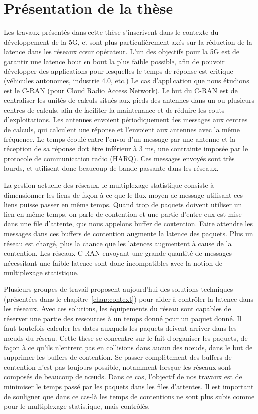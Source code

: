 
\chapter*{Présentation de la thèse}
\label{chap:introfr}
\minitoc

Les travaux présentés dans cette thèse s'inscrivent dans le contexte du développement de la 5G, et sont plus particulièrement axés sur la réduction de la latence dans les réseaux cœur opérateur.
L'un des objectifs pour la 5G est de garantir une latence bout en bout la plus faible possible, afin de pouvoir développer des applications pour lesquelles le temps de réponse est critique (véhicules autonomes, industrie 4.0, etc.)
Le cas d'application que nous étudions est le C-RAN (pour Cloud Radio Access Network). Le but du C-RAN est de centraliser les unités de calculs situés aux pieds des antennes dans un ou plusieurs centres de calculs, afin de faciliter la maintenance et de réduire les couts d'exploitations. Les antennes envoient périodiquement des messages aux centres de calculs, qui calculent une réponse et l'envoient aux antennes avec la même fréquence. Le temps écoulé entre l'envoi d'un message par une antenne et la réception de sa réponse doit être inférieur à $3$ ms, une contrainte imposée par le protocole de communication radio (HARQ). Ces messages envoyés sont très lourds, et utilisent donc beaucoup de bande passante dans les réseaux.

La gestion actuelle des réseaux, le multiplexage statistique consiste à dimensionner les liens de façon à ce que le flux moyen de message utilisant ces liens puisse passer en même temps. Quand trop de paquets doivent utiliser un lien en même temps, on parle de contention et une partie d'entre eux est mise dans une file d'attente, que nous appelons buffer de contention. Faire attendre les messages dans ces buffers de contention augmente la latence des paquets. Plus un réseau est chargé, plus la chance que les latences augmentent à cause de la contention. Les réseaux C-RAN envoyant une grande quantité de messages nécessitant une faible latence sont donc incompatibles avec la notion de multiplexage statistique.

Plusieurs groupes de travail proposent aujourd'hui des solutions techniques (présentées dans le chapitre~\ref{chap:context}) pour aider à contrôler la latence dans les réseaux. Avec ces solutions, les équipements du réseau sont capables de réserver une partie des ressources à un temps donné pour un paquet donné. Il faut toutefois calculer les dates auxquels les paquets doivent arriver dans les nœuds du réseau. Cette thèse se concentre sur le fait d'organiser les paquets, de façon à ce qu'ils n'entrent pas en collisions dans aucun des nœuds, dans le but de supprimer les buffers de contention. Se passer complètement des buffers de contention n'est pas toujours possible, notamment lorsque les réseaux sont composés de beaucoup de nœuds. Dans ce cas, l'objectif de nos travaux est de minimiser le temps passé par les paquets dans les files d'attentes. Il est important de souligner que dans ce cas-là les temps de contentions ne sont plus subis comme pour le multiplexage statistique, mais contrôlés.

